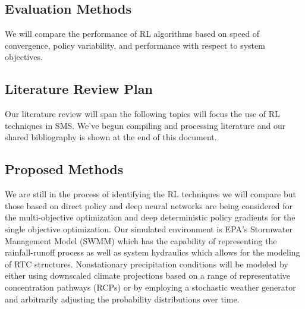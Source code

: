 \documentclass[11pt,a4paper]{article}
\begin{document}
\subsection*{Evaluation Methods}
We will compare the performance of RL algorithms based on speed of convergence, policy variability, and performance with respect to system objectives.

\subsection*{Literature Review Plan}
Our literature review will span the following topics will focus the use of RL techniques in SMS. We've begun compiling and processing literature and our shared bibliography is shown at the end of this document.

\subsection*{Proposed Methods}
We are still in the process of identifying the RL techniques we will compare but those based on direct policy and deep neural networks are being considered for the multi-objective optimization and deep deterministic policy gradients for the single objective optimization. Our simulated environment is EPA's Stormwater Management Model (SWMM) which has the capability of representing the rainfall-runoff process as well as system hydraulics which allows for the modeling of RTC structures. Nonstationary precipitation conditions will be modeled by either using downscaled climate projections based on a range of representative concentration pathways (RCPs) or by employing a stochastic weather generator and arbitrarily adjusting the probability distributions over time.

\nocite{*}
\printbibliography
\end{document}
